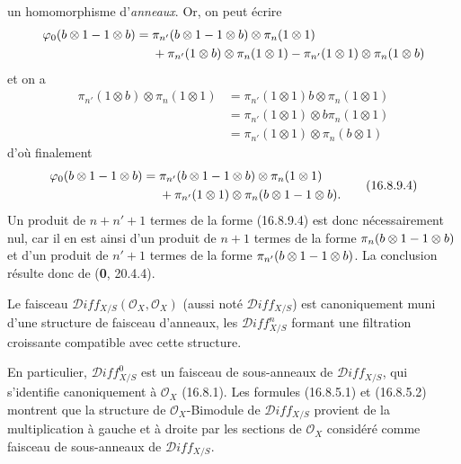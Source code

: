 un homomorphisme d'\emph{anneaux}. Or, on peut écrire
\[
  \begin{aligned}
  \varphi_0(b\otimes1- 1\otimes b)
  ={}&\pi_{n'}(b\otimes1- 1\otimes b)\otimes\pi_n(1\otimes1)\\
  &+\pi_{n'}(1\otimes b)\otimes\pi_n(1\otimes1)
  -\pi_{n'}(1\otimes1)\otimes\pi_n(1\otimes b)
  \end{aligned}
\]
et on a
\[
  \begin{aligned}
  \pi_{n'}(1\otimes b)\otimes\pi_n(1\otimes1)
  &=\pi_{n'}(1\otimes1)b\otimes\pi_n(1\otimes1)\\
  &=\pi_{n'}(1\otimes1)\otimes b\pi_n(1\otimes1)\\
  &=\pi_{n'}(1\otimes1)\otimes\pi_n(b\otimes1)
  \end{aligned}
\]
d'où finalement
\[
  \begin{aligned}
  \varphi_0(b\otimes1- 1\otimes b)
  ={}&\pi_{n'}(b\otimes1- 1\otimes b)\otimes\pi_n(1\otimes1)\\
  &+\pi_{n'}(1\otimes1)\otimes\pi_n(b\otimes1- 1\otimes b).
  \end{aligned}
  \tag{16.8.9.4}
  \label{IV.16.8.9.4}
\]
Un produit de $n+n'+1$ termes de la forme (16.8.9.4) est donc
nécessairement nul, car il en est ainsi d'un produit de $n+1$ termes de la
forme $\pi_n(b\otimes1- 1\otimes b)$ et d'un produit de $n'+1$ termes de la
forme $\pi_{n'}(b\otimes1- 1\otimes b)$. La conclusion résulte donc de
(\textbf{0}, 20.4.4).

\begin{corollary}[16.8.10]
\label{IV.16.8.10}
Le faisceau $\mathscr{D}\!iff_{X/S}(\mathcal{O}_X,\mathcal{O}_X)$ (aussi noté
$\mathscr{D}\!iff_{X/S}$) est canoniquement muni d'une structure de faisceau
d'anneaux, les $\mathscr{D}\!iff_{X/S}^n$ formant une filtration croissante
compatible avec cette structure.
\end{corollary}

En particulier, $\mathscr{D}\!iff_{X/S}^0$ est un faisceau de sous-anneaux de
$\mathscr{D}\!iff_{X/S}$, qui s'identifie canoniquement à $\mathcal{O}_X$
(16.8.1). Les formules (16.8.5.1) et (16.8.5.2) montrent que la structure de
$\mathcal{O}_X$-Bimodule de $\mathscr{D}\!iff_{X/S}$ provient de la
multiplication à gauche et à droite par les sections de $\mathcal{O}_X$
considéré comme faisceau de sous-anneaux de $\mathscr{D}\!iff_{X/S}$.

